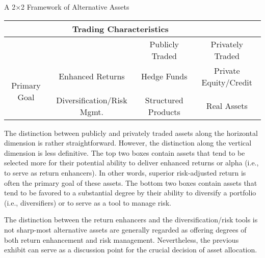 \documentclass[11pt]{article}
\begin{document}
A 2×2 Framework of Alternative Assets

\begin{center}
\begin{tabular}{|c|c|c|c|}
\hline
 & \multicolumn{2}{|c|}{Trading Characteristics} &  \\
\hline
 &  & Publicly Traded & Privately Traded \\
\hline
\multirow{3}{*}{Primary Goal} & Enhanced Returns & Hedge Funds & Private Equity/Credit \\
\hline
 &  &  &  \\
\hline
 & Diversification/Risk Mgmt. & Structured Products & Real Assets \\
\hline
\end{tabular}
\end{center}

The distinction between publicly and privately traded assets along the horizontal dimension is rather straightforward. However, the distinction along the vertical dimension is less definitive. The top two boxes contain assets that tend to be selected more for their potential ability to deliver enhanced returns or alpha (i.e., to serve as return enhancers). In other words, superior risk-adjusted return is often the primary goal of these assets. The bottom two boxes contain assets that tend to be favored to a substantial degree by their ability to diversify a portfolio (i.e., diversifiers) or to serve as a tool to manage risk.

The distinction between the return enhancers and the diversification/risk tools is not sharp-most alternative assets are generally regarded as offering degrees of both return enhancement and risk management. Nevertheless, the previous exhibit can serve as a discussion point for the crucial decision of asset allocation.
\end{document}

